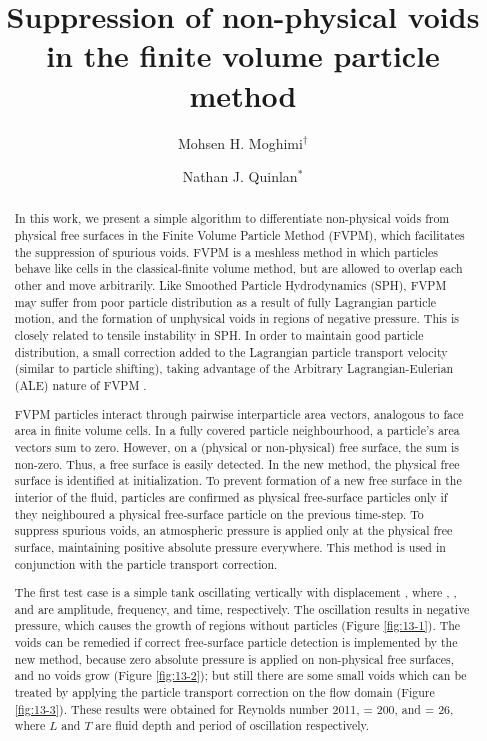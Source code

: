 \documentclass[10pt]{article}
\title{Suppression of non-physical voids in the finite volume particle method}
\date{}
\author[$\relax$]{Mohsen H. Moghimi$^\dagger$}
\author[$\relax$]{Nathan J. Quinlan$^*$}
\affil[$\relax$]{National University of Ireland Galway, Ireland}
\affil[$\relax$]{\email{\dagger}{m.hassanzadehmoghimi1@nuigalway.ie},\email{*}{nathan.quinlan@nuigalway.ie}}
\begin{document}
\maketitle


\begin{abstract}
In this work, we present a simple algorithm to differentiate non-physical voids from physical free surfaces in the Finite Volume Particle Method (FVPM), which facilitates the suppression of spurious voids. FVPM is a meshless method in which particles behave like cells in the classical-finite volume method, but are allowed to overlap each other and move arbitrarily. Like Smoothed Particle Hydrodynamics (SPH), FVPM may suffer from poor particle distribution as a result of fully Lagrangian particle motion, and the formation of unphysical voids in regions of negative pressure. This is closely related to tensile instability in SPH. In order to maintain good particle distribution, a small correction added to the Lagrangian particle transport velocity (similar to particle shifting), taking advantage of the Arbitrary Lagrangian-Eulerian (ALE) nature of FVPM \cite{nestor2009extension}.

FVPM particles interact through pairwise interparticle area vectors, analogous to face area in finite volume cells. In a fully covered particle neighbourhood, a particle's area vectors sum to zero. However, on a (physical or non-physical) free surface, the sum is non-zero. Thus, a free surface is easily detected. In the new method, the physical free surface is identified at initialization. To prevent formation of a new free surface in the interior of the fluid, particles are confirmed as physical free-surface particles only if they neighboured a physical free-surface particle on the previous time-step. To suppress spurious voids, an atmospheric pressure is applied only at the physical free surface, maintaining positive absolute pressure everywhere. This method is used in conjunction with the particle transport correction.

The first test case is a simple tank oscillating vertically with displacement , where , , and  are amplitude, frequency, and time, respectively. The oscillation results in negative pressure, which causes the growth of regions without particles (Figure \ref{fig:13-1}). The voids can be remedied if correct free-surface particle detection is implemented by the new method, because zero absolute pressure is applied on non-physical free surfaces, and no voids grow (Figure \ref{fig:13-2}); but still there are some small voids which can be treated by applying the particle transport correction on the flow domain (Figure \ref{fig:13-3}). These results were obtained for Reynolds number 2011, = 200, and = 26, where $L$ and $T$ are fluid depth and period of oscillation respectively.


\end{abstract}
\end{document}
